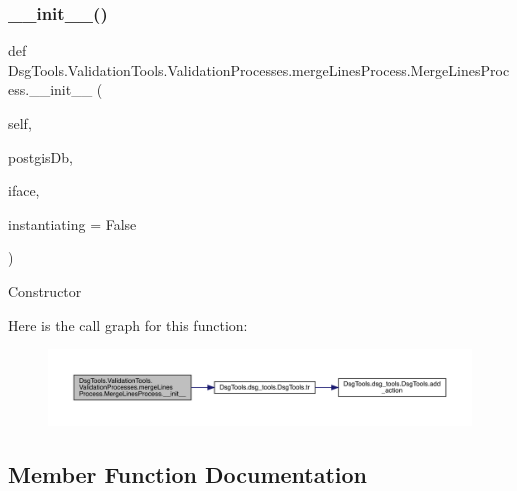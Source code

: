 \subsubsection{\texorpdfstring{\+\_\+\+\_\+init\+\_\+\+\_\+()}{\_\_init\_\_()}}
{\footnotesize\ttfamily def Dsg\+Tools.\+Validation\+Tools.\+Validation\+Processes.\+merge\+Lines\+Process.\+Merge\+Lines\+Process.\+\_\+\+\_\+init\+\_\+\+\_\+ (\begin{DoxyParamCaption}\item[{}]{self,  }\item[{}]{postgis\+Db,  }\item[{}]{iface,  }\item[{}]{instantiating = {\ttfamily False} }\end{DoxyParamCaption})}

\begin{DoxyVerb}Constructor
\end{DoxyVerb}
 Here is the call graph for this function\+:
\nopagebreak
\begin{figure}[H]
\begin{center}
\leavevmode
\includegraphics[width=350pt]{class_dsg_tools_1_1_validation_tools_1_1_validation_processes_1_1merge_lines_process_1_1_merge_lines_process_af9141d9594009388128355dba358cdb9_cgraph}
\end{center}
\end{figure}


\subsection{Member Function Documentation}
\mbox{\label{class_dsg_tools_1_1_validation_tools_1_1_validation_processes_1_1merge_lines_process_1_1_merge_lines_process_a08ced55b571d27565f10e2834604e8c7}} 

